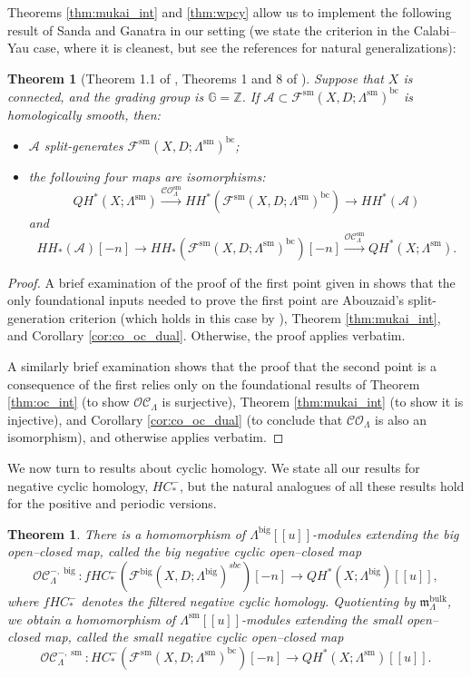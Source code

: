 \documentclass{article}
\newtheorem{thm}[lem]{Theorem}
\def\G{\mathbb{G}}
\def\fuk{\EuF}
\def\bc{\mathsf{bc}}
\newcommand{\fm}{\mathfrak{m}}
\def\G{\mathbb{G}}
\def\cO{\mathcal{O}}
\def\cA{\mathcal{A}}
\def\cC{\mathcal{C}}
\def\Z{\mathbb{Z}}
\def\fuk{\mathcal{F}}
\def\bc{{\operatorname{bc}}}
\def\big{{\operatorname{big}}}
\def\sm{{\operatorname{sm}}}
\def\bulk{{\operatorname{bulk}}}
\begin{document}
Theorems \ref{thm:mukai_int} and \ref{thm:wpcy} allow us to implement the following result of Sanda and Ganatra \cite{Sanda,Ganatra2016} in our setting (we state the criterion in the Calabi--Yau case, where it is cleanest, but see the references for natural generalizations):

\begin{thm}[Theorem 1.1 of \cite{Sanda}, Theorems 1 and 8 of \cite{Ganatra2016}]\label{thm:aut_gen}
    Suppose that $X$ is connected, and the grading group is $\G = \Z$. 
    If $\cA \subset \fuk^\sm(X,D;\Lambda^\sm)^\bc$ is homologically smooth, then:
    \begin{itemize}
        \item $\cA$ split-generates $\fuk^\sm(X,D;\Lambda^\sm)^\bc$;
        \item the following four maps are isomorphisms:
        $$QH^*(X;\Lambda^\sm) \xrightarrow{\cC\cO_\Lambda^\sm} HH^*(\fuk^\sm(X,D;\Lambda^\sm)^\bc) \to HH^*(\cA)$$
        and
        $$HH_*(\cA)[-n] \to HH_*(\fuk^\sm(X,D;\Lambda^\sm)^\bc)[-n] \xrightarrow{\cO\cC_\Lambda^\sm} QH^*(X;\Lambda^\sm).$$
    \end{itemize}
\end{thm}
\begin{proof}
    A brief examination of the proof of the first point given in \cite[Section 5]{Ganatra2016} shows that the only foundational inputs needed to prove the first point are Abouzaid's split-generation criterion \cite{Abouzaid2010a} (which holds in this case by \cite[Theorem 1.13]{relfukii}), Theorem \ref{thm:mukai_int}, and Corollary \ref{cor:co_oc_dual}. 
    Otherwise, the proof applies verbatim.

    A similarly brief examination shows that the proof that the second point is a consequence of the first relies only on the foundational results of Theorem \ref{thm:oc_int} (to show $\cO\cC_\Lambda$ is surjective), Theorem \ref{thm:mukai_int} (to show it is injective), and Corollary \ref{cor:co_oc_dual} (to conclude that $\cC\cO_\Lambda$ is also an isomorphism), and otherwise applies verbatim.
\end{proof}

We now turn to results about cyclic homology. 
We state all our results for negative cyclic homology, $HC_*^-$, but the natural analogues of all these results hold for the positive and periodic versions.

\begin{thm}\label{thm:OC_minus_bc}
    There is a homomorphism of $\Lambda^\big[[u]]$-modules extending the big open--closed map, called the \emph{big negative cyclic open--closed map}
    $$\cO\cC_\Lambda^{-,\big}: fHC_*^-(\fuk^\big(X,D;\Lambda^\big)^{sbc})[-n] \to QH^{*}(X;\Lambda^\big)[[u]],$$
    where $fHC_*^-$ denotes the filtered negative cyclic homology. 
    Quotienting by $\fm^\bulk_\Lambda$, we obtain a homomorphism of $\Lambda^\sm[[u]]$-modules extending the small open--closed map, called the \emph{small negative cyclic open--closed map}
    $$\cO\cC_\Lambda^{-,\sm}: HC_*^-(\fuk^\sm(X,D;\Lambda^\sm)^\bc) [-n] \to QH^*(X;\Lambda^\sm)[[u]].$$
\end{thm}
\end{document}
